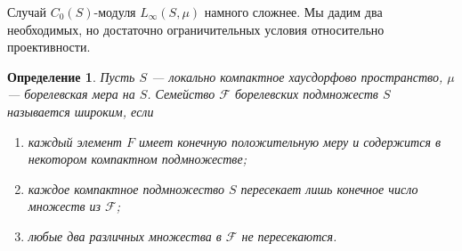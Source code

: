 \documentclass[12pt]{article}
\numberwithin{equation}{subsection}
\theoremstyle{plain}
\newtheorem{definition}{Определение}
\begin{document}
\begin{fulltext}
    Случай $C_0(S)$-модуля $L_\infty(S,\mu)$ намного сложнее. Мы дадим два
    необходимых, но достаточно ограничительных условия относительно
    проективности.

    \begin{definition}\label{WideFamilyDef} Пусть $S$ --- локально компактное
        хаусдорфово пространство, $\mu$ --- борелевская мера на $S$. Семейство
        $\mathcal{F}$ борелевских подмножеств $S$ называется широким, если

        \begin{enumerate}[label = (\roman*)]
            \item каждый элемент $F$ имеет конечную положительную меру и
                  содержится в некотором компактном подмножестве;

            \item каждое компактное подмножество $S$ пересекает лишь конечное
                  число множеств из $\mathcal{F}$;

            \item любые два различных множества в $\mathcal{F}$ не пересекаются.
        \end{enumerate}
    \end{definition}


\end{fulltext}
\end{document}
